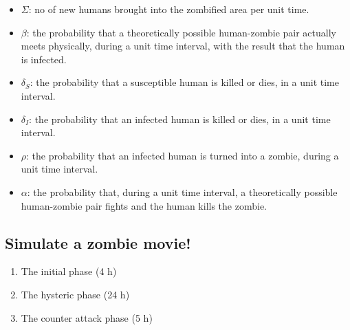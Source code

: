\documentclass[%
twoside,                 %
final,                   %
10pt]{article}
\newenvironment{block_mdfboxadmon}[1][]{
\begin{block_mdfboxmdframed}[frametitle=#1]
}
{
\end{block_mdfboxmdframed}
}
\begin{document}
\begin{block_mdfboxadmon}
\vspace{0.5mm}\par\noindent
{\footnotesize 
\begin{itemize}
  \item $\Sigma$: no of new humans brought into the zombified area per unit time.

  \item $\beta$: the probability that a theoretically possible human-zombie pair actually meets physically, during a unit time interval, with the result that the human is infected.

  \item $\delta_S$: the probability that a susceptible human is killed or dies, in a unit time interval.

  \item $\delta_I$: the probability that an infected human is killed or dies, in a unit time interval.

  \item $\rho$: the probability that an infected human is turned into a zombie, during a unit time interval.

  \item $\alpha$: the probability that, during a unit time interval, a theoretically possible human-zombie pair fights and the human kills the zombie.
\end{itemize}

\noindent
\par}
\end{block_mdfboxadmon}



\subsection{Simulate a zombie movie!}


\begin{block_mdfboxadmon}
\begin{enumerate}
\item The initial phase (4 h)

\item The hysteric phase (24 h)

\item The counter attack phase (5 h)
\end{enumerate}

\noindent
\end{block_mdfboxadmon}
\end{document}
